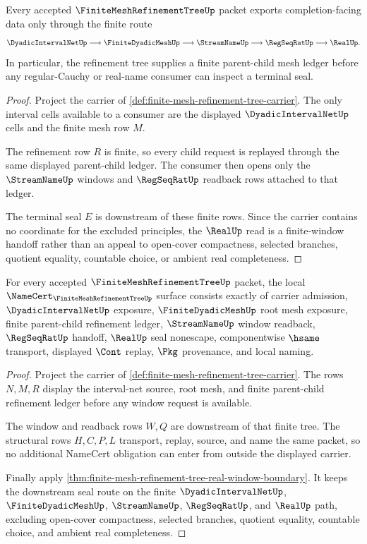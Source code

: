 \begin{theorem}
\label{thm:finite-mesh-refinement-tree-real-window-boundary}
Every accepted $\FiniteMeshRefinementTreeUp$ packet exports completion-facing data only through the finite route
$$
\DyadicIntervalNetUp \longrightarrow \FiniteDyadicMeshUp \longrightarrow \StreamNameUp \longrightarrow \RegSeqRatUp \longrightarrow \RealUp .
$$
In particular, the refinement tree supplies a finite parent-child mesh ledger before any regular-Cauchy or real-name consumer can inspect a terminal seal.
\end{theorem}
\begin{proof}
Project the carrier of \autoref{def:finite-mesh-refinement-tree-carrier}. The only interval cells available to a consumer are the displayed $\DyadicIntervalNetUp$ cells and the finite mesh row $M$.

The refinement row $R$ is finite, so every child request is replayed through the same displayed parent-child ledger. The consumer then opens only the $\StreamNameUp$ windows and $\RegSeqRatUp$ readback rows attached to that ledger.

The terminal seal $E$ is downstream of these finite rows. Since the carrier contains no coordinate for the excluded principles, the $\RealUp$ read is a finite-window handoff rather than an appeal to open-cover compactness, selected branches, quotient equality, countable choice, or ambient real completeness.
\end{proof}

\begin{theorem}
\label{thm:finite-mesh-refinement-tree-namecert-obligations}
For every accepted $\FiniteMeshRefinementTreeUp$ packet, the local $\NameCert_{\FiniteMeshRefinementTreeUp}$ surface consists exactly of carrier admission, $\DyadicIntervalNetUp$ exposure, $\FiniteDyadicMeshUp$ root mesh exposure, finite parent-child refinement ledger, $\StreamNameUp$ window readback, $\RegSeqRatUp$ handoff, $\RealUp$ seal nonescape, componentwise $\hsame$ transport, displayed $\Cont$ replay, $\Pkg$ provenance, and local naming.
\end{theorem}
\begin{proof}
Project the carrier of \autoref{def:finite-mesh-refinement-tree-carrier}. The rows $N,M,R$ display the interval-net source, root mesh, and finite parent-child refinement ledger before any window request is available.

The window and readback rows $W,Q$ are downstream of that finite tree. The structural rows $H,C,P,L$ transport, replay, source, and name the same packet, so no additional NameCert obligation can enter from outside the displayed carrier.

Finally apply \autoref{thm:finite-mesh-refinement-tree-real-window-boundary}. It keeps the downstream seal route on the finite $\DyadicIntervalNetUp$, $\FiniteDyadicMeshUp$, $\StreamNameUp$, $\RegSeqRatUp$, and $\RealUp$ path, excluding open-cover compactness, selected branches, quotient equality, countable choice, and ambient real completeness.
\end{proof}

